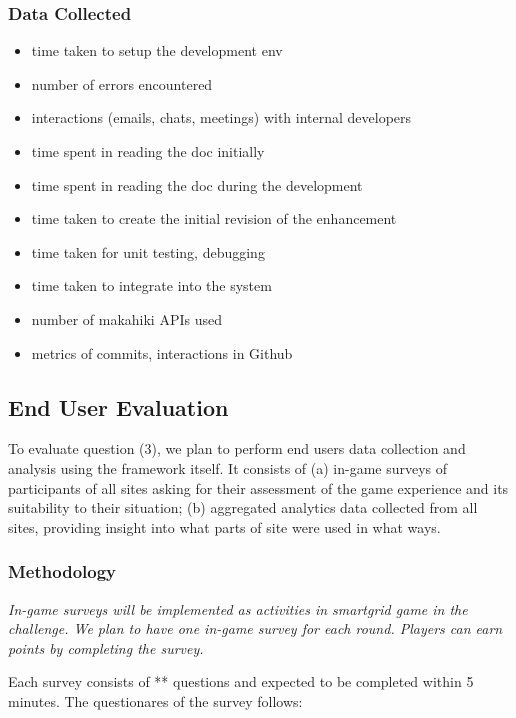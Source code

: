 \documentclass[11pt]{article}
\begin{document}
\subsubsection{Data Collected}
\begin{itemize}
 \item time taken to setup the development env
 \item number of errors encountered
 \item interactions (emails, chats, meetings) with internal developers
 \item time spent in reading the doc initially
 \item time spent in reading the doc during the development
 \item time taken to create the initial revision of the enhancement
 \item time taken for unit testing, debugging
 \item time taken to integrate into the system
 \item number of makahiki APIs used
 \item metrics of commits, interactions in Github
 
\end{itemize}

\subsection{End User Evaluation}
To evaluate question (3), we plan to perform end users data collection and analysis using the framework itself. It consists of (a) in-game surveys of participants of all sites asking for their assessment of the game experience and its suitability to their situation;
(b) aggregated analytics data collected from all sites, providing insight into what parts of site were used in what ways.

\subsubsection{Methodology}

\em In-game surveys \em will be implemented as activities in smartgrid game in the challenge. We plan to have one in-game survey for each round. Players can earn points by completing the survey.

Each survey consists of ** questions and expected to be completed within 5 minutes. The questionares of the survey follows:
\end{document}
